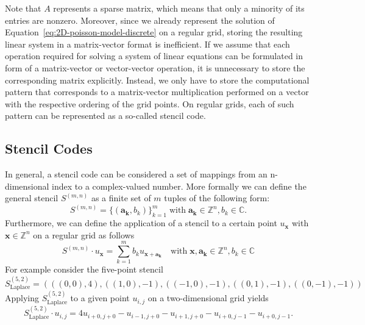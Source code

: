 Note that $A$ represents a sparse matrix, which means that only a minority of its entries are nonzero.
Moreover, since we already represent the solution of Equation~\ref{eq:2D-poisson-model-discrete} on a regular grid, storing the resulting linear system in a matrix-vector format is inefficient.
If we assume that each operation required for solving a system of linear equations can be formulated in form of a matrix-vector or vector-vector operation, it is unnecessary to store the corresponding matrix explicitly.
Instead, we only have to store the computational pattern that corresponds to a matrix-vector multiplication performed on a vector with the respective ordering of the grid points.
On regular grids, each of such pattern can be represented as a so-called stencil code.
\subsection{Stencil Codes}
In general, a stencil code can be considered a set of mappings from an n-dimensional index to a complex-valued number.
More formally we can define the general stencil $S^{(m,n)}$ as a finite set of $m$ tuples of the following form:
\begin{equation}
	S^{(m, n)} = \{(\bm{a_k}, b_k) \}_{k=1}^m \; \text{with} \; \bm{a_k} \in \mathbb{Z}^n, b_k \in \mathbb{C}.
\end{equation}
Furthermore, we can define the application of a stencil to a certain point $u_{\bm x}$ with $\bm x \in \mathbb{Z}^n$ on a regular grid as follows
\begin{equation}
	S^{(m, n)} \cdot u_{\bm x} = \sum_{k=1}^m b_k u_{\bm x + \bm{a_k}} \quad \text{with}\; \bm{x}, \bm{a_k} \in \mathbb{Z}^n, b_k \in \mathbb{C}
\end{equation}
For example consider the five-point stencil
\begin{equation}
	S_{\text{Laplace}}^{(5,2)} = (((0,0), 4), ((1,0), -1), ((-1,0), -1), ((0,1), -1), ((0,-1), -1))
\end{equation}
Applying $S_{\text{Laplace}}^{(5,2)}$ to a given point $u_{i,j}$ on a two-dimensional grid yields 
\begin{equation}
	S_{\text{Laplace}}^{(5,2)} \cdot u_{i,j} = 4 u_{i+0,j+0}  - u_{i-1,j+0} - u_{i+1,j+0} - u_{i+0,j-1} - u_{i+0,j-1}.
\end{equation}




